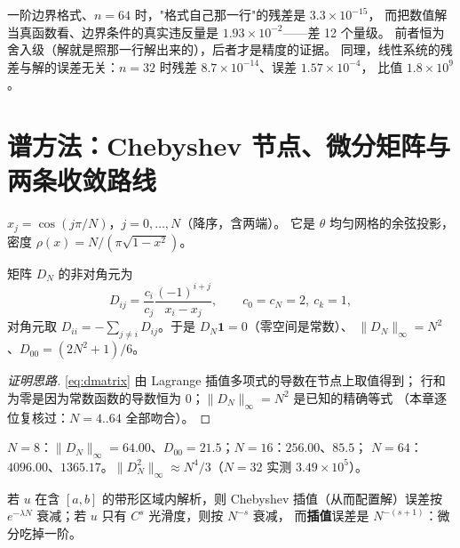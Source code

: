 \begin{remark}[边界残差的两个口径]
一阶边界格式、$n=64$ 时，"格式自己那一行"的残差是 $3.3\times10^{-15}$，
而把数值解当真函数看、边界条件的真实违反量是 $1.93\times10^{-2}$——差 12 个量级。
前者恒为舍入级（解就是照那一行解出来的），后者才是精度的证据。
同理，线性系统的残差与解的误差无关：$n=32$ 时残差 $8.7\times10^{-14}$、误差 $1.57\times10^{-4}$，
比值 $1.8\times10^{9}$。
\end{remark}

\section{谱方法：Chebyshev 节点、微分矩阵与两条收敛路线}

\begin{definition}
$x_j=\cos(j\pi/N)$，$j=0,\dots,N$（降序，含两端）。
它是 $\theta$ 均匀网格的余弦投影，密度 $\rho(x)=N/(\pi\sqrt{1-x^2})$。
\end{definition}

\begin{theorem}[配置微分矩阵]
\label{thm:dmatrix}
矩阵 $D_N$ 的非对角元为
\begin{equation}
  D_{ij}=\frac{c_i}{c_j}\frac{(-1)^{i+j}}{x_i-x_j},\qquad c_0=c_N=2,\ c_k=1,
  \label{eq:dmatrix}
\end{equation}
对角元取 $D_{ii}=-\sum_{j\ne i}D_{ij}$。于是 $D_N\mathbf{1}=0$（零空间是常数）、
$\|D_N\|_\infty=N^2$、$D_{00}=(2N^2+1)/6$。
\end{theorem}
\begin{proof}[证明思路]
\eqref{eq:dmatrix} 由 Lagrange 插值多项式的导数在节点上取值得到；
行和为零是因为常数函数的导数恒为 $0$；$\|D_N\|_\infty=N^2$ 是已知的精确等式
（本章逐位复核过：$N=4..64$ 全部吻合）。
\end{proof}

\begin{remark}[实测：$\|D_N\|_\infty=N^2$ 逐位吻合，$D_{00}=(2N^2+1)/6$ 到 $10^{-13}$]
$N=8$：$\|D_N\|_\infty=64.00$、$D_{00}=21.5$；$N=16$：$256.00$、$85.5$；
$N=64$：$4096.00$、$1365.17$。$\|D_N^2\|_\infty\approx N^4/3$（$N=32$ 实测 $3.49\times10^{5}$）。
\end{remark}

\begin{theorem}[指数收敛与代数收敛]
\label{thm:conv}
若 $u$ 在含 $[a,b]$ 的带形区域内解析，则 Chebyshev 插值（从而配置解）误差按
$e^{-\lambda N}$ 衰减；若 $u$ 只有 $C^s$ 光滑度，则按 $N^{-s}$ 衰减，
而\textbf{插值}误差是 $N^{-(s+1)}$：微分吃掉一阶。
\end{theorem}

